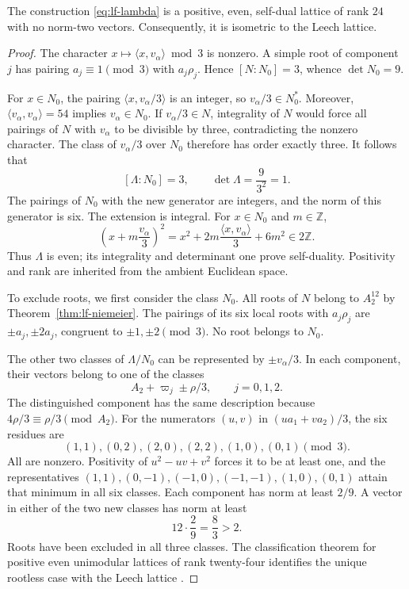 \begin{theorem}
\label{thm:lf-leech}
The construction \eqref{eq:lf-lambda} is a
positive, even, self-dual lattice of rank \(24\)
with no norm-two vectors. Consequently, it is
isometric to the Leech lattice.
\end{theorem}
\begin{proof}
The character \(x\mapsto\langle x,v_\alpha\rangle\bmod3\)
is nonzero. A simple root of component \(j\)
has pairing \(a_j\equiv1\pmod3\) with
\(a_j\rho_j\). Hence \([N:N_0]=3\), whence
\(\det N_0=9\).

For \(x\in N_0\), the pairing
\(\langle x,v_\alpha/3\rangle\) is an integer, so
\(v_\alpha/3\in N_0^*\). Moreover,
\(\langle v_\alpha,v_\alpha\rangle=54\) implies
\(v_\alpha\in N_0\). If \(v_\alpha/3\in N\),
integrality of \(N\) would force all
pairings of \(N\) with \(v_\alpha\) to be
divisible by three, contradicting the nonzero
character. The class of \(v_\alpha/3\) over \(N_0\)
therefore has order exactly three. It follows that
\[
 [\Lambda:N_0]=3,\qquad
 \det\Lambda=\frac9{3^2}=1.
\]
The pairings of \(N_0\) with the new
generator are integers, and the norm of this generator
is six. The extension is integral. For
\(x\in N_0\) and \(m\in\mathbb Z\),
\[
 \left(x+m\frac{v_\alpha}{3}\right)^2
 =x^2+2m\frac{\langle x,v_\alpha\rangle}{3}
       +6m^2\in2\mathbb Z.
\]
Thus \(\Lambda\) is even; its integrality and
determinant one prove self-duality.
Positivity and rank are inherited from the ambient
Euclidean space.

To exclude roots, we first consider the
class \(N_0\). All roots of \(N\) belong
to \(A_2^{12}\) by Theorem~\ref{thm:lf-niemeier}.
The pairings of its six local roots
with \(a_j\rho_j\) are \(\pm a_j,\pm2a_j\),
congruent to \(\pm1,\pm2\pmod3\).
No root belongs to \(N_0\).

The other two classes of \(\Lambda/N_0\) can
be represented by \(\pm v_\alpha/3\).
In each component, their vectors belong to
one of the classes
\[
 A_2+\varpi_j\pm\rho/3,\qquad j=0,1,2.
\]
The distinguished component has the same
description because \(4\rho/3\equiv\rho/3\pmod{A_2}\).
For the numerators \((u,v)\) in
\((ua_1+va_2)/3\), the six residues are
\[
 (1,1),(0,2),(2,0),(2,2),(1,0),(0,1)\pmod3.
\]
All are nonzero. Positivity of
\(u^2-uv+v^2\) forces it to be at least one,
and the representatives
\((1,1),(0,-1),(-1,0),(-1,-1),(1,0),(0,1)\)
attain that minimum in all six classes.
Each component has norm at least \(2/9\).
A vector in either of the two new
classes has norm at least
\[
 12\cdot\frac29=\frac83>2.
\]
Roots have been excluded in all three classes.
The classification theorem for positive
even unimodular lattices of rank twenty-four
identifies the unique rootless case with the
Leech lattice \cite{ConwaySloane}.
\end{proof}

